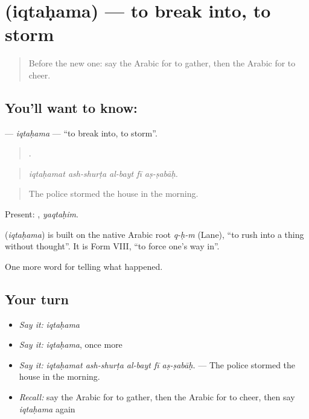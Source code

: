 \section[\texorpdfstring{\ar{اقتحم} (iqtaḥama)}{اقتحم (iqtaḥama)}]{ (iqtaḥama) — to break into, to storm}

\label{lesson:AR-C353-iqtahama}



\begin{quote}
Before the new one: say the Arabic for to gather, then the Arabic for to cheer.
\end{quote}

\subsection*{You'll want to know: }
\textbf{} — \emph{iqtaḥama} — \textquotedblleft{}to break into, to storm\textquotedblright{}.

\begin{quote}
    .
\end{quote}

\begin{quote}
\emph{iqtaḥamat ash-shurṭa al-bayt fī aṣ-ṣabāḥ.}
\end{quote}

\begin{quote}
The police stormed the house in the morning.
\end{quote}

Present: , \emph{yaqtaḥim}.

\begin{cousinweb}
\textbf{} (\emph{iqtaḥama}) is built on the native Arabic root \emph{q-ḥ-m} (Lane), \textquotedblleft{}to rush into a thing without thought\textquotedblright{}. It is Form VIII, \textquotedblleft{}to force one's way in\textquotedblright{}.
\end{cousinweb}

\begin{grammarlens}[title={What you've built}]
One more word for telling what happened.
\end{grammarlens}

\subsection*{Your turn}
\begin{itemize}
\raggedright
  \item \emph{Say it:} \emph{iqtaḥama}
  \item \emph{Say it:} \emph{iqtaḥama}, once more
  \item \emph{Say it:} \emph{iqtaḥamat ash-shurṭa al-bayt fī aṣ-ṣabāḥ.} — The police stormed the house in the morning.
  \item \emph{Recall:} say the Arabic for to gather, then the Arabic for to cheer, then say \emph{iqtaḥama} again
\end{itemize}

